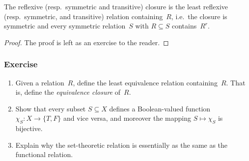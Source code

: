 \begin{proposition}
  The reflexive (resp.\ symmetric and transitive) closure is the least reflexive
  (resp.\ symmetric, and transitive) relation containing~$R$, i.e.\ the closure
  is symmetric and every symmetric relation~$S$ with $R \subseteq S$
  contains~$R^r$.
\end{proposition}
\begin{proof}
  The proof is left as an exercise to the reader.
\end{proof}
\subsubsection*{Exercise}
\begin{enumerate}
  \item Given a relation~$R$, define the least equivalence relation 
    containing~$R$. That is, define the \emph{equivalence closure} of~$R$.
  \item Show that every subset $S \subseteq X$ defines a Boolean-valued 
    function $\chi_S\colon X \to \{T, F\}$ and vice versa, and moreover the
    mapping $S \mapsto \chi_S$ is bijective. 
  \item Explain why the set-theoretic relation is essentially as the same as the
    functional relation. 
\end{enumerate}


 

